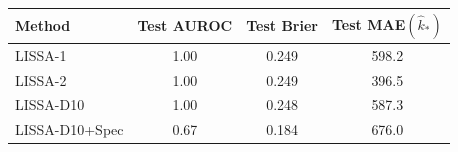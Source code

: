 \begin{tabular}{lccc}
\toprule
Method & Test AUROC & Test Brier & Test MAE$(\hat{k}_*)$ \\
\midrule
LISSA-1 & 1.00 & 0.249 & 598.2 \\
LISSA-2 & 1.00 & 0.249 & 396.5 \\
LISSA-D10 & 1.00 & 0.248 & 587.3 \\
LISSA-D10+Spec & 0.67 & 0.184 & 676.0 \\
\bottomrule
\end{tabular}

